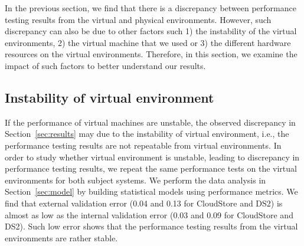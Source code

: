 
In the previous section, we find that there is a discrepancy between performance testing results from the virtual and physical environments. However, such discrepancy can also be due to other factors such 1) the instability of the virtual environments, 2) the virtual machine that we used or 3) the different hardware resources on the virtual environments. Therefore, in this section, we examine the impact of such factors to better understand our results. 


\subsection{Instability of virtual environment}

If the performance of virtual machines are unstable, the observed discrepancy in Section~\ref{sec:results} may due to the instability of virtual environment, i.e., the performance testing results are not repeatable from virtual environments. In order to study whether virtual environment is unstable, leading to discrepancy in performance testing results, we repeat the same performance tests on the virtual environments for both subject systems. We perform the data analysis in Section~\ref{sec:model} by building statistical models using performance metrics. %
We find that external validation error (0.04 and 0.13 for CloudStore and DS2) is almost as low as the internal validation error (0.03 and 0.09 for CloudStore and DS2). Such low error shows that the performance testing results from the virtual environments are rather stable. 


